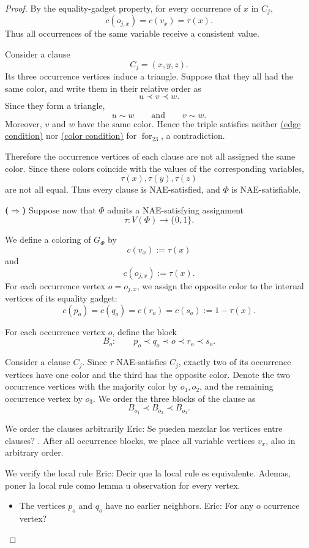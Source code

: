 \documentclass[12pt]{article}
\theoremstyle{plain}
\theoremstyle{definition}
\theoremstyle{remark}
\theoremstyle{definition}
\newcommand{\edgecondition}{%
  \hyperref[def:avoid:cond:edge]{(edge condition)}\xspace
}
\newcommand{\colorcondition}{%
  \hyperref[def:avoid:cond:color]{(color condition)}\xspace
}
\newcommand{\eric}[1]{%
  \textcolor{green!50!black}{Eric: #1}%
}
\begin{document}
\begin{proof}
By the equality-gadget property, for every occurrence of \(x\) in \(C_j\),
\[
c(o_{j,x})=c(v_x)=\tau(x).
\]
Thus all occurrences of the same variable receive a consistent value.

Consider a clause
\[
C_j=(x,y,z).
\]
Its three occurrence vertices induce a triangle. Suppose that they all had the same color, and write them in their
relative order as
\[
u\prec v\prec w.
\]
Since they form a triangle,
\[
u\sim w
\qquad\text{and}\qquad
v\sim w.
\]
Moreover, \(v\) and \(w\) have the same color. Hence the triple satisfies neither \edgecondition{} nor
\colorcondition{} for \(\operatorname{for}_{23}\), a contradiction.

Therefore the occurrence vertices of each clause are not all assigned the same color. Since these colors coincide
with the values of the corresponding variables,
\[
\tau(x),\tau(y),\tau(z)
\]
are not all equal. Thus every clause is NAE-satisfied, and \(\Phi\) is NAE-satisfiable.

\medskip
\noindent\textbf{(\(\Rightarrow\))}
Suppose now that \(\Phi\) admits a NAE-satisfying assignment
\[
\tau:V(\Phi)\to\{0,1\}.
\]

We define a coloring of \(G_\Phi\) by
\[
c(v_x):=\tau(x)
\]
and
\[
c(o_{j,x}):=\tau(x).
\]
For each occurrence vertex \(o=o_{j,x}\), we assign the opposite color to the internal vertices of its equality
gadget:
\[
c(p_o)=c(q_o)=c(r_o)=c(s_o):=1-\tau(x).
\]

For each occurrence vertex \(o\), define the block
\[
B_o:
\qquad
p_o\prec q_o\prec o\prec r_o\prec s_o.
\]

Consider a clause \(C_j\). Since \(\tau\) NAE-satisfies \(C_j\), exactly two of its occurrence vertices have one
color and the third has the opposite color. Denote the two occurrence vertices with the majority color by
\(o_1,o_2\), and the remaining occurrence vertex by \(o_3\). We order the three blocks of the clause as
\[
B_{o_1}\prec B_{o_2}\prec B_{o_3}.
\]

We order the clauses arbitrarily \eric{Se pueden mezclar los vertices entre clauses?}. After all occurrence blocks, we place all variable vertices \(v_x\), also in
arbitrary order.

We verify the local rule\eric{Decir que la local rule es equivalente. Ademas, poner la local rule como lemma u observation} for every vertex.

\begin{itemize}
\item The vertices \(p_o\) and \(q_o\) have no earlier neighbors.\eric{For any o ocurrence vertex?}


\end{itemize}
\end{proof}
\end{document}
